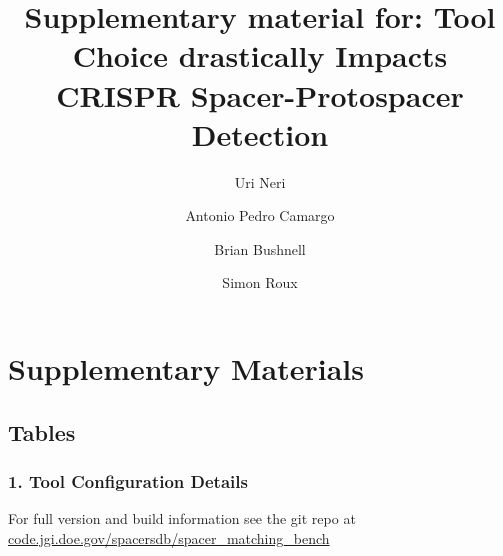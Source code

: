 \documentclass[
]{article}
\title{Supplementary material for: Tool Choice drastically Impacts
CRISPR Spacer-Protospacer Detection}
\author{Uri Neri \and Antonio Pedro Camargo \and Brian
Bushnell \and Simon Roux}
\date{}
\begin{document}
\maketitle


\section{Supplementary Materials}\label{supplementary-materials}

\subsection{Tables}\label{tables}

\subsubsection{1. Tool Configuration
Details}\label{tool-configuration-details}

For full version and build information see the git repo at
\href{https://code.jgi.doe.gov/spacersdb/spacer_matching_bench}{code.jgi.doe.gov/spacersdb/spacer\_matching\_bench}
\end{document}

